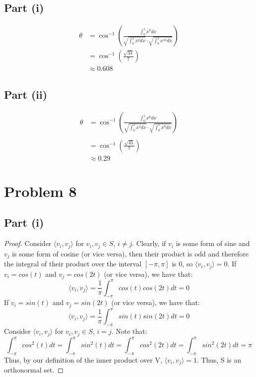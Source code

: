 \documentclass{article}
\begin{document}
\subsection*{Part (i)}

\begin{align*}
\theta &= \cos^{-1}(\frac{\int_0^1 x^6 dx}{\sqrt{\int_0^1 x^2 dx} \cdot \sqrt{\int_0^1 x^{10} dx}}) \\
&= \cos^{-1}(\frac{\sqrt{33}}{7}) \\
&\approx 0.608
\end{align*}

\subsection*{Part (ii)}

\begin{align*}
\theta &= \cos^{-1}(\frac{\int_0^1 x^6 dx}{\sqrt{\int_0^1 x^4 dx} \cdot \sqrt{\int_0^1 x^{8} dx}}) \\ \\
&= \cos^{-1}(\frac{\sqrt{45}}{7}) \\
&\approx 0.29
\end{align*}


\section*{Problem 8}

\subsection*{Part (i)}

\begin{proof}
Consider $\langle v_i, v_j \rangle$ for $v_i, v_j \in S$, $i \ne j$. Clearly, if $v_i$ is some form of sine and $v_j$ is some form of cosine (or vice versa), then their product is odd and therefore the integral of their product over the interval $[-\pi, \pi]$ is $0$, so $\langle v_i, v_j \rangle = 0$. If $v_i = cos(t)$ and $v_j = cos(2t)$ (or vice versa), we have that:
$$\langle v_i, v_j \rangle = \frac{1}{\pi}\int_{-\pi}^\pi cos(t) cos(2t) dt = 0$$
If $v_i = sin(t)$ and $v_j = sin(2t)$ (or vice versa), we have that:
$$\langle v_i, v_j \rangle = \frac{1}{\pi}\int_{-\pi}^\pi sin(t) sin(2t) dt = 0$$
Consider $\langle v_i, v_j \rangle$ for $v_i, v_j \in S$, $i = j$. Note that:
$$\int_{-\pi}^\pi cos^2(t) dt = \int_{-\pi}^\pi sin^2(t) dt = \int_{-\pi}^\pi cos^2(2t) dt = \int_{-\pi}^\pi sin^2(2t) dt = \pi$$
Thus, by our definition of the inner product over V, $\langle v_i, v_j \rangle = 1$. Thus, S is an orthonormal set.
\end{proof}
\end{document}
